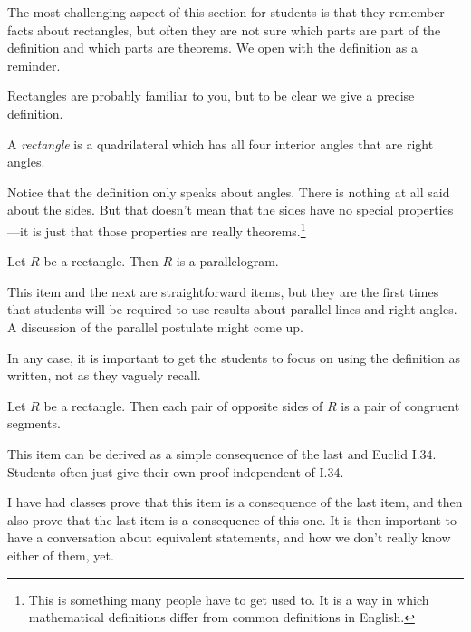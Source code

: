 \begin{annotation}
{
\color{blue}
The most challenging aspect of this section for students is that they remember facts about rectangles, but often they are not sure which parts are part of the definition and which parts are theorems. We open with the definition as a reminder.
}
\end{annotation}


Rectangles are probably familiar to you, but to be clear we give a precise definition.
\begin{definition}\label{defn:rectangle}
A \emph{rectangle} is a quadrilateral which has all four interior angles that are right angles.
\end{definition}

Notice that the definition only speaks about angles. There is nothing at all said about the sides.
But that doesn't mean that the sides have no special properties---it is just that those properties are really theorems.\footnote{This is something many people have to get used to. It is a way in which mathematical definitions differ from common definitions in English.}

\begin{conjecture}\label{conj:rectangle-parallelogram}
Let $R$ be a rectangle. Then $R$ is a parallelogram.
\end{conjecture}

\begin{annotation}
{
\color{blue}
This item and the next are straightforward items, but they are the first times that students will be required to use results about parallel lines and right angles. A discussion of the parallel postulate might come up.

In any case, it is important to get the students to focus on using the definition as written, not as they vaguely recall.
}
\end{annotation}

\begin{conjecture}\label{conj:rectangle-opp-sides}
Let $R$ be a rectangle. Then each pair of opposite sides of $R$ is a pair of congruent segments.
\end{conjecture}

\begin{annotation}
{
\color{blue}
This item can be derived as a simple consequence of the last and Euclid I.34. Students often just give their own proof independent of I.34.

I have had classes prove that this item is a consequence of the last item, and then also prove that the last item is a consequence of this one. It is then important to have a conversation about equivalent statements, and how we don't really know either of them, yet.
}
\end{annotation}

